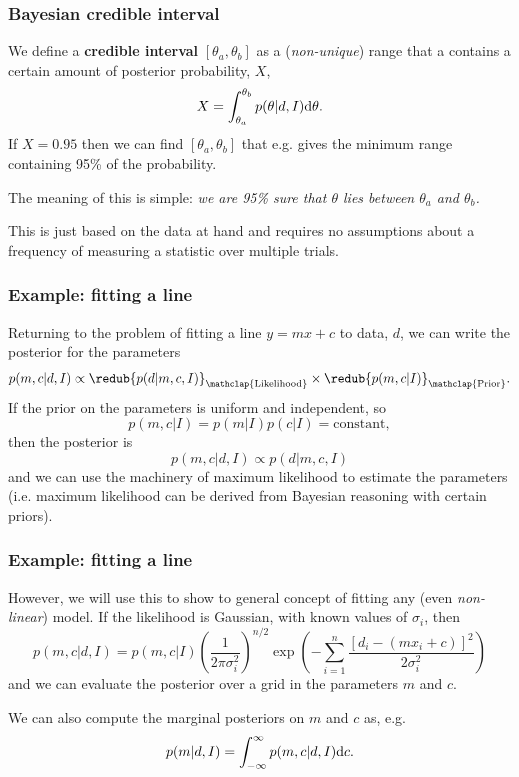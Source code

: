 \begin{frame}

\frametitle{Bayesian credible interval}
\label{bayesiancredibleinterval}

We define a \textbf{credible interval} $[\theta_a, \theta_b]$ as a (\emph{non-unique}) range that a
contains a certain amount of posterior probability, $X$,
\[
X = \int_{\theta_a}^{\theta_b} p(\theta|d,I) {\rm d}\theta.
\]
If $X=0.95$ then we can find $[\theta_a, \theta_b]$ that e.g. gives the minimum range containing
95\% of the probability.

The meaning of this is simple: \emph{we are 95\% sure that $\theta$ lies between $\theta_a$ and $\theta_b$.}

This is just based on the data at hand and requires no assumptions about a frequency of measuring a
statistic over multiple trials.

\end{frame}

\begin{frame}

\frametitle{Example: fitting a line}
\label{example:fittingaline}

Returning to the problem of fitting a line $y = mx+c$ to data, $d$, we can write the posterior for
the parameters
\[
p(m,c|d,I) \propto \redub{p(d|m,c,I)}_{\mathclap{\text{Likelihood}}} \times \redub{p(m,c|I)}_{\mathclap{\text{Prior}}}.
\]
If the prior on the parameters is uniform and independent, so
\[
p(m,c|I) = p(m|I)p(c|I) = \text{constant},
\]
then the posterior is
\[
p(m,c|d,I) \propto p(d|m,c,I)
\]
and we can use the machinery of maximum likelihood to estimate the parameters (i.e. maximum
likelihood can be derived from Bayesian reasoning with certain priors).

\end{frame}

\begin{frame}

\frametitle{Example: fitting a line}
\label{example:fittingaline}

However, we will use this to show to general concept of fitting any (even \emph{non-linear}) model. If
the likelihood is Gaussian, with known values of $\sigma_i$, then
\[
p(m,c|d,I) = p(m,c|I)\left(\frac{1}{2\pi \sigma_i^2}\right)^{n/2}\exp{\left(-\sum_{i=1}^n\frac{[d_i-(m x_i + c)]^2}{2\sigma_i^2}\right)}
\]
and we can evaluate the posterior over a grid in the parameters $m$ and $c$.

We can also compute the marginal posteriors on $m$ and $c$ as, e.g.
\[
p(m|d,I) = \int_{-\infty}^{\infty} p(m,c|d,I) {\rm d}c.
\]

\end{frame}

